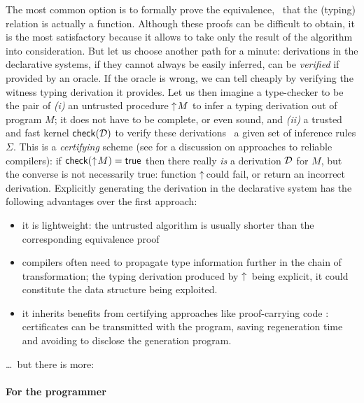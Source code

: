 \documentclass{llncs}
\begin{document}
The most common option is to formally prove the equivalence, \ie\ that
the (typing) relation is actually a function. Although these proofs
can be difficult to obtain, it is the most satisfactory because it
allows to take only the result of the algorithm into
consideration. But let us choose another path for a minute:
derivations in the declarative systems, if they cannot always be
easily inferred, can be \emph{verified} if provided by an oracle. If
the oracle is wrong, we can tell cheaply by verifying the witness
typing derivation it provides. Let us then imagine a type-checker to
be the pair of \emph{(i)} an untrusted procedure $\uparrow\!{M}$ to infer
a typing derivation out of program $M$; it does not have to be
complete, or even sound, and \emph{(ii)} a trusted and fast kernel
${\text{\textsf{check}}}({\mathcal D})$ to verify these derivations \wrt\ a given set of
inference rules $\Sigma$. This is a \emph{certifying} scheme (see
\cite{leroy2006compcert} for a discussion on approaches to reliable
compilers): if ${\text{\textsf{check}}}({\uparrow\!{M}}) = \text{\textsf{true}}$ then there really
\emph{is} a derivation $\mathcal D$ for $M$, but the converse is not
necessarily true: function $\uparrow\!{}\!\!$ could fail, or return an
incorrect derivation. Explicitly generating the derivation in the
declarative system has the following advantages over the first
approach:
\begin{itemize}
\item it is lightweight: the untrusted algorithm is usually shorter
  than the corresponding equivalence proof
\item compilers often need to propagate type information further in
  the chain of transformation; the typing derivation produced by
  $\uparrow\!{}$ being explicit, it could constitute the data structure
  being exploited.
\item it inherits benefits from certifying approaches like
  proof-carrying code \cite{necula1997proof}: certificates can be
  transmitted with the program, saving regeneration time and avoiding
  to disclose the generation program.
\end{itemize}
\ldots\ but there is more:

\paragraph{For the programmer}
\end{document}
